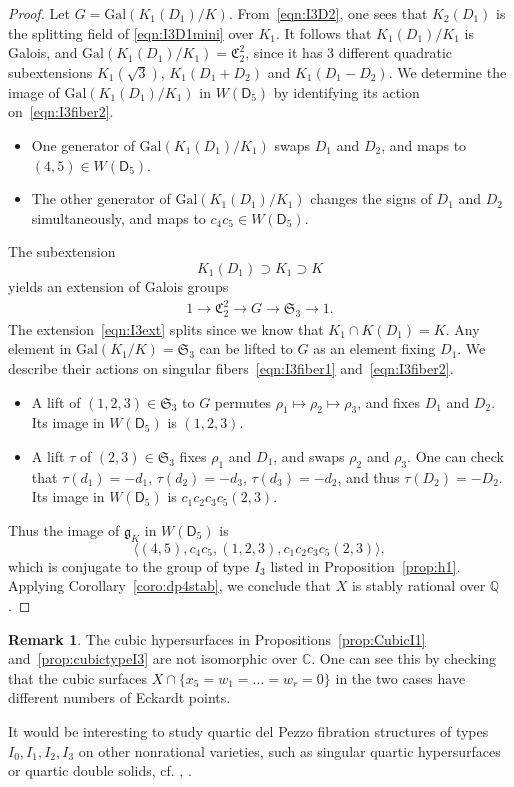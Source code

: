 \documentclass[12pt, reqno]{amsart}
\theoremstyle{plain}
\theoremstyle{remark}
\theoremstyle{definition}
\newtheorem{rema}[prop]{Remark}
\numberwithin{equation}{section}
\def\sD{{\mathsf D}}
\def\fC{{\mathfrak C}}
\def\fS{{\mathfrak S}}
\def\fS{{\mathfrak S}}
\def\bQ{{\mathbb Q}}
\def\bC{{\mathbb C}}
\def\Gal{\mathrm{Gal}}
\begin{document}
\begin{proof}
 Let $G=\Gal(K_1(D_1)/K)$. From~\eqref{eqn:I3D2}, one sees that $K_2(D_1)$ is the splitting field of \eqref{eqn:I3D1mini} over $K_1$. It follows that $K_1(D_1)/K_1$ is Galois, and $\Gal(K_1(D_1)/K_1)=\fC_2^2$, since it has 3 different quadratic subextensions $K_1(\sqrt3)$, $K_1(D_1+D_2)$ and $K_1(D_1-D_2)$. We determine the image of $\Gal(K_1(D_1)/K_1)$ in $W(\sD_5)$ by identifying its action on~\eqref{eqn:I3fiber2}.
\begin{itemize}
    \item One generator of $\Gal(K_1(D_1)/K_1)$ swaps $D_1$ and $D_2$, and maps to $(4,5)\in W(\sD_5)$.
    \item The other generator of $\Gal(K_1(D_1)/K_1)$ changes the signs of $D_1$ and $D_2$ simultaneously, and maps to $c_4c_5\in W(\sD_5).$
\end{itemize}
The subextension 
$$
K_1(D_1)\supset K_1\supset K
$$
yields an extension of Galois groups
\begin{align}
    \label{eqn:I3ext}
    1\to \fC_2^2\to G\to\fS_3\to 1.
\end{align}
The extension~\eqref{eqn:I3ext} splits since we know that 
$
  K_1\cap K(D_1)=K.  
$
Any element in $\Gal(K_1/K)=\fS_3$ can be lifted to $G$ as an element fixing $D_1$. We describe their actions on singular fibers~\eqref{eqn:I3fiber1} and~\eqref{eqn:I3fiber2}.
\begin{itemize}
    \item A lift of $(1,2,3)\in\fS_3$ to $G$ permutes $\rho_1\mapsto\rho_2\mapsto\rho_3$, and fixes $D_1$ and $D_2$. Its image in $W(\sD_5)$ is $(1,2,3)$.
    \item A lift $\tau$ of $(2,3)\in\fS_3$ fixes $\rho_1$ and $D_1$, and swaps $\rho_2$ and $\rho_3$. One can check that $\tau (d_1)=-d_1$, $\tau(d_2)=-d_3$, $\tau(d_3)=-d_2$, and thus $\tau(D_2)=-D_2$. Its image in $W(\sD_5)$ is $c_1c_2c_3c_5(2,3)$.
\end{itemize}
Thus the image of $\mathfrak g_K$ in $W(\sD_5)$ is 
$$
\langle (4,5),c_4c_5,(1,2,3),c_1c_2c_3c_5(2,3)\rangle,
$$
which is conjugate to the group of type $I_3$ listed in Proposition~\ref{prop:h1}. Applying Corollary~\ref{coro:dp4stab}, we conclude that $X$ is stably rational over $\bQ$. 
\end{proof} 


\begin{rema}
 The cubic hypersurfaces in Propositions~\ref{prop:CubicI1} and~\ref{prop:cubictypeI3} are not isomorphic over $\bC$. One can see this by checking that the cubic surfaces $X\cap\{x_5=w_1=\ldots=w_r=0\}$
 in the two cases have different numbers of Eckardt points.
 
 It would be interesting to study quartic del Pezzo fibration structures of types $I_0,I_1,I_2,I_3$ on other nonrational varieties, such as singular quartic hypersurfaces or quartic double solids, cf. \cite{cheltsovquartic}, \cite{Voisinquartic}.
\end{rema}
\end{document}
